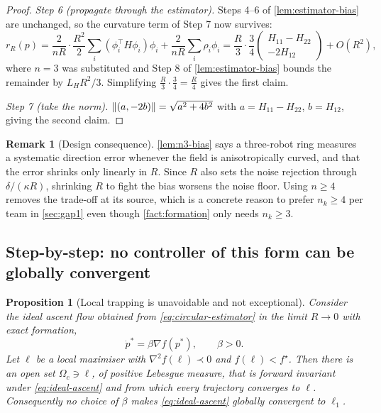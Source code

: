 \documentclass[11pt,a4paper]{article}
\theoremstyle{plain}
\newtheorem{proposition}{Proposition}
\theoremstyle{definition}
\newtheorem{remark}{Remark}
\DeclarePairedDelimiter{\norm}{\lVert}{\rVert}
\begin{document}
\begin{proof}
\emph{Step 6 (propagate through the estimator).} Steps 4--6 of \cref{lem:estimator-bias} are
unchanged, so the curvature term of Step 7 now survives:
\begin{equation*}
    r_R(p)=\frac{2}{nR}\cdot\frac{R^2}{2}\sum_i\left(\phi_i^{\top}H\phi_i\right)\phi_i
    +\frac{2}{nR}\sum_i\rho_i\phi_i
    =\frac R3\cdot\frac34\begin{pmatrix}H_{11}-H_{22}\\-2H_{12}\end{pmatrix}
    +O\!\left(R^2\right),
\end{equation*}
where $n=3$ was substituted and Step 8 of \cref{lem:estimator-bias} bounds the remainder by
$L_HR^2/3$. Simplifying $\frac R3\cdot\frac34=\frac R4$ gives the first claim.

\emph{Step 7 (take the norm).} $\norm{\left(a,-2b\right)}=\sqrt{a^2+4b^2}$ with
$a=H_{11}-H_{22}$, $b=H_{12}$, giving the second claim.
\end{proof}

\begin{remark}[Design consequence]\label{rem:n3-design}
\cref{lem:n3-bias} says a three-robot ring measures a systematic direction error whenever the
field is anisotropically curved, and that the error shrinks only linearly in $R$. Since $R$ also
sets the noise rejection through $\delta/(\kappa R)$, shrinking $R$ to fight the bias worsens the
noise floor. Using $n\geq4$ removes the trade-off at its source, which is a concrete reason to
prefer $n_k\geq4$ per team in \cref{sec:gap1} even though \cref{fact:formation} only needs
$n_k\geq3$.
\end{remark}

\subsection{Step-by-step: no controller of this form can be globally convergent}\label{sec:gap3-trapping}

\begin{proposition}[Local trapping is unavoidable and not exceptional]\label{prop:no-global-guarantee}
Consider the ideal ascent flow obtained from \eqref{eq:circular-estimator} in the limit
$R\to0$ with exact formation,
\begin{equation}\label{eq:ideal-ascent}
    \dot p^*=\beta\nabla f\!\left(p^*\right),
    \qquad\beta>0 .
\end{equation}
Let $\ell$ be a local maximiser with $\nabla^2f(\ell)\prec0$ and $f(\ell)<f^\star$. Then there is
an open set $\Omega_c\ni\ell$, of positive Lebesgue measure, that is forward invariant under
\eqref{eq:ideal-ascent} and from which every trajectory converges to $\ell$. Consequently no
choice of $\beta$ makes \eqref{eq:ideal-ascent} globally convergent to $\ell_1$.
\end{proposition}
\end{document}

